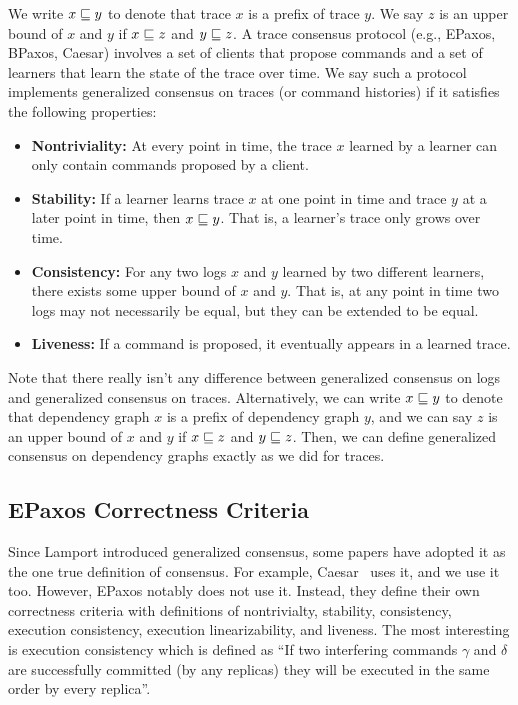 We write $x \sqsubseteq y$ to denote that trace $x$ is a prefix of trace $y$.  We
say $z$ is an upper bound of $x$ and $y$ if $x \sqsubseteq z$ and $y \sqsubseteq
z$. A trace consensus protocol (e.g., EPaxos, BPaxos, Caesar) involves a set of
clients that propose commands and a set of learners that learn the state of the
trace over time. We say such a protocol implements generalized consensus on
traces (or command histories) if it satisfies the following properties:
\begin{itemize}
  \item \textbf{Nontriviality:}
    At every point in time, the trace $x$ learned by a learner can only contain
    commands proposed by a client.

  \item \textbf{Stability:}
    If a learner learns trace $x$ at one point in time and trace $y$ at a later
    point in time, then $x \sqsubseteq y$. That is, a learner's trace only grows
    over time.

  \item \textbf{Consistency:}
    For any two logs $x$ and $y$ learned by two different learners, there
    exists some upper bound of $x$ and $y$. That is, at any point in time two
    logs may not necessarily be equal, but they can be extended to be equal.

  \item \textbf{Liveness:}
    If a command is proposed, it eventually appears in a learned trace.
\end{itemize}

Note that there really isn't any difference between generalized consensus on
logs and generalized consensus on traces. Alternatively, we can write $x
\sqsubseteq y$ to denote that dependency graph $x$ is a prefix of dependency
graph $y$, and we can say $z$ is an upper bound of $x$ and $y$ if $x \sqsubseteq
z$ and $y \sqsubseteq z$. Then, we can define generalized consensus on dependency
graphs exactly as we did for traces.

\subsection{EPaxos Correctness Criteria}
Since Lamport introduced generalized consensus, some papers have adopted it as
the one true definition of consensus. For example,
Caesar~\cite{arun2017speeding} uses it, and we use it too. However, EPaxos
notably does not use it. Instead, they define their own correctness criteria
with definitions of nontrivialty, stability, consistency, execution
consistency, execution linearizability, and liveness. The most interesting is
execution consistency which is defined as ``If two interfering commands
$\gamma$ and $\delta$ are successfully committed (by any replicas) they will be
executed in the same order by every replica''.

